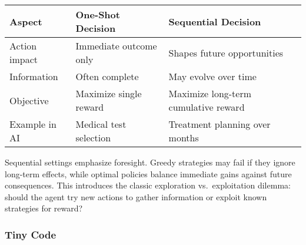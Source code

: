 \documentclass[
  letterpaper,
  DIV=11,
  numbers=noendperiod]{scrreprt}
\begin{document}
\begin{longtable}[]{@{}
  >{\raggedright\arraybackslash}p{}
  >{\raggedright\arraybackslash}p{}
  >{\raggedright\arraybackslash}p{}@{}}
\toprule\noalign{}
\begin{minipage}[b]{\linewidth}\raggedright
Aspect
\end{minipage} & \begin{minipage}[b]{\linewidth}\raggedright
One-Shot Decision
\end{minipage} & \begin{minipage}[b]{\linewidth}\raggedright
Sequential Decision
\end{minipage} \\
\midrule\noalign{}
\endhead
\bottomrule\noalign{}
\endlastfoot
Action impact & Immediate outcome only & Shapes future opportunities \\
Information & Often complete & May evolve over time \\
Objective & Maximize single reward & Maximize long-term cumulative
reward \\
Example in AI & Medical test selection & Treatment planning over
months \\
\end{longtable}

Sequential settings emphasize foresight. Greedy strategies may fail if
they ignore long-term effects, while optimal policies balance immediate
gains against future consequences. This introduces the classic
exploration vs.~exploitation dilemma: should the agent try new actions
to gather information or exploit known strategies for reward?

\subsubsection{Tiny Code}\label{tiny-code-68}
\end{document}
